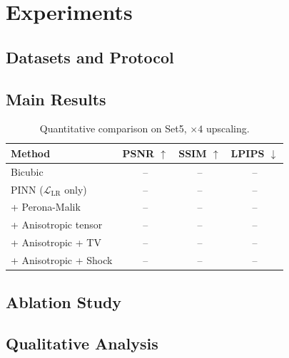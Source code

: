 \documentclass[conference]{IEEEtran}
\newcommand{\loss}{\mathcal{L}}
\begin{document}
\section{Experiments}

\subsection{Datasets and Protocol}

\subsection{Main Results}
\begin{table}[t]
\caption{Quantitative comparison on Set5, $\times 4$ upscaling.}
\label{tab:main}
\begin{center}
\begin{tabular}{lccc}
\toprule
Method & PSNR $\uparrow$ & SSIM $\uparrow$ & LPIPS $\downarrow$ \\
\midrule
Bicubic                              & -- & -- & -- \\
PINN ($\loss_{\text{LR}}$ only)       & -- & -- & -- \\
+ Perona-Malik                        & -- & -- & -- \\
+ Anisotropic tensor                  & -- & -- & -- \\
+ Anisotropic + TV                    & -- & -- & -- \\
+ Anisotropic + Shock                 & -- & -- & -- \\
\bottomrule
\end{tabular}
\end{center}
\end{table}

\subsection{Ablation Study}

\subsection{Qualitative Analysis}
\end{document}
